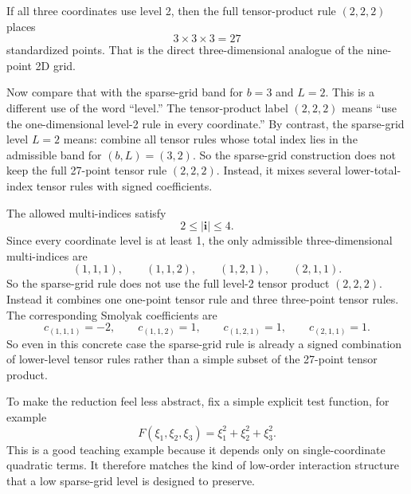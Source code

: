 \documentclass[11pt]{article}
\numberwithin{equation}{section}
\begin{document}
If all three coordinates use level 2, then the full tensor-product rule
\((2,2,2)\) places
\begin{equation}
  3\times 3\times 3 = 27
  \label{eq:p37-27-points}
\end{equation}
standardized points.  That is the direct three-dimensional analogue of the
nine-point 2D grid.

Now compare that with the sparse-grid band for \(b=3\) and \(L=2\).  This is a
different use of the word ``level.''  The tensor-product label \((2,2,2)\)
means ``use the one-dimensional level-2 rule in every coordinate.''  By
contrast, the sparse-grid level \(L=2\) means: combine all tensor rules whose
total index lies in the admissible band for \((b,L)=(3,2)\).  So the sparse-grid
construction does not keep the full 27-point tensor rule \((2,2,2)\).  Instead,
it mixes several lower-total-index tensor rules with signed coefficients.

The allowed multi-indices satisfy
\begin{equation}
  2\le |\mathbf i| \le 4.
  \label{eq:p37-3d-band}
\end{equation}
Since every coordinate level is at least 1, the only admissible three-dimensional
multi-indices are
\begin{equation}
  (1,1,1),
  \qquad
  (1,1,2),
  \qquad
  (1,2,1),
  \qquad
  (2,1,1).
  \label{eq:p37-3d-active-indices}
\end{equation}
So the sparse-grid rule does not use the full level-2 tensor product
\((2,2,2)\).  Instead it combines one one-point tensor rule and three
three-point tensor rules.  The corresponding Smolyak coefficients are
\begin{equation}
  c_{(1,1,1)}=-2,
  \qquad
  c_{(1,1,2)}=1,
  \qquad
  c_{(1,2,1)}=1,
  \qquad
  c_{(2,1,1)}=1.
  \label{eq:p37-3d-coeffs}
\end{equation}
So even in this concrete case the sparse-grid rule is already a signed
combination of lower-level tensor rules rather than a simple subset of the
27-point tensor product.

To make the reduction feel less abstract, fix a simple explicit test function,
for example
\begin{equation}
  F(\xi_1,\xi_2,\xi_3)=\xi_1^2+\xi_2^2+\xi_3^2.
  \label{eq:p39-3d-test-function}
\end{equation}
This is a good teaching example because it depends only on single-coordinate
quadratic terms.  It therefore matches the kind of low-order interaction
structure that a low sparse-grid level is designed to preserve.
\end{document}
